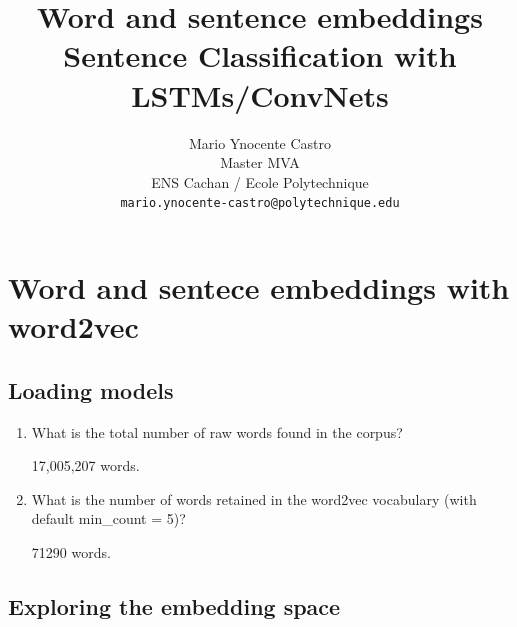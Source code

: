 \documentclass{article} %
\title{Word and sentence embeddings\\
Sentence Classification with LSTMs/ConvNets}
\author{
Mario Ynocente Castro\\
Master MVA\\
ENS Cachan / Ecole Polytechnique\\
\texttt{mario.ynocente-castro@polytechnique.edu}
}
\begin{document}
\maketitle

\section{Word and sentece embeddings with word2vec}

\subsection{Loading models}

\begin{enumerate}
    \item
    What is the total number of raw words found in the corpus?

    17,005,207 words.

    \item
    What is the number of words retained in the word2vec vocabulary
    (with default min\_count = 5)?

    71290 words.
\end{enumerate}

\subsection{Exploring the embedding space}
\end{document}
